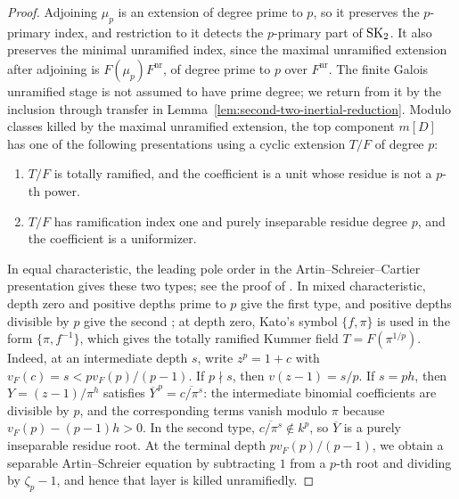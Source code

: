 \begin{proof}
Adjoining $\mu_p$ is an extension of degree prime to $p$, so it preserves the $p$-primary index, and restriction to it detects the $p$-primary part of $\operatorname{SK}_2$.
It also preserves the minimal unramified index, since the maximal unramified extension after adjoining is $F(\mu_p)F^{\mathrm{nr}}$, of degree prime to $p$ over $F^{\mathrm{nr}}$.
The finite Galois unramified stage is not assumed to have prime degree; we return from it by the inclusion through transfer in Lemma~\ref{lem:second-two-inertial-reduction}.
Modulo classes killed by the maximal unramified extension, the top component $m[D]$ has one of the following presentations using a cyclic extension $T/F$ of degree $p$:
\begin{enumerate}
\item $T/F$ is totally ramified, and the coefficient is a unit whose residue is not a $p$-th power.
\item $T/F$ has ramification index one and purely inseparable residue degree $p$, and the coefficient is a uniformizer.
\end{enumerate}
In equal characteristic, the leading pole order in the Artin--Schreier--Cartier presentation gives these two types; see the proof of \cite[\S4, Lemma 5, pp.~338--339]{KatoLocalI}.
In mixed characteristic, depth zero and positive depths prime to $p$ give the first type, and positive depths divisible by $p$ give the second \cite[\S2, Proposition 2(i)--(iii), pp.~321--322, and \S4, p.~339]{KatoLocalI}; at depth zero, Kato's symbol $\{f,\pi\}$ is used in the form $\{\pi,f^{-1}\}$, which gives the totally ramified Kummer field $T=F(\pi^{1/p})$.
Indeed, at an intermediate depth $s$, write $z^p=1+c$ with $v_F(c)=s<pv_F(p)/(p-1)$.
If $p\nmid s$, then $v(z-1)=s/p$.
If $s=ph$, then $Y=(z-1)/\pi^h$ satisfies $\overline Y^{\,p}=\overline{c/\pi^s}$: the intermediate binomial coefficients are divisible by $p$, and the corresponding terms vanish modulo $\pi$ because $v_F(p)-(p-1)h>0$.
In the second type, $\overline{c/\pi^s}\notin k^p$, so $\overline Y$ is a purely inseparable residue root.
At the terminal depth $pv_F(p)/(p-1)$, we obtain a separable Artin--Schreier equation by subtracting $1$ from a $p$-th root and dividing by $\zeta_p-1$, and hence that layer is killed unramifiedly.


\end{proof}
